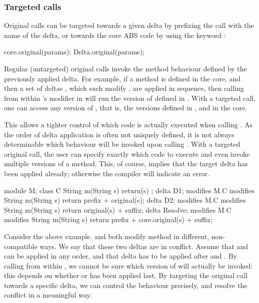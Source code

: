 \subsubsection{Targeted  calls}
Original calls can be targeted towards a given delta by prefixing the call with
the name of the delta, or towards the core ABS code by using the keyword
:
\begin{abscode}
core.original(params);
Delta.original(params);
\end{abscode}

Regular (untargeted) original calls invoke the method behaviour defined by the previously applied delta.
For example, if a method  is defined in the core, and then a set of deltas
, which each modify , are applied in sequence,
then calling  from within 's modifier in
 will run the version of  defined in .
With a targeted call, one can access any version of , that is, the
versions defined in ,  and in the core.

This allows a tighter control of which code is actually executed
when calling . As the order of delta application is often
not uniquely defined, it is not always determinable which behaviour will be invoked upon
calling . With a targeted original call, the user can
specify exactly which code to execute and even invoke multiple versions of a
method. This, of course, implies that the target delta has been applied already;
otherwise the compiler will indicate an error.

\begin{abscode}
module M;
class C {
    String m(String s) { return(s) };
}
delta D1;
modifies M.C {
    modifies String m(String s) { return prefix + original(s); }
}
delta D2;
modifies M.C {
    modifies String m(String s) { return original(s) + suffix; }
}
delta Resolve;
modifies M.C {
    modifies String m(String s) { return prefix + core.original(s) + suffix; }
}
\end{abscode}

Consider the above example.  and  both modify method  in
different, non-compatible ways. We say that these two deltas are in conflict.
Assume that  and  can be applied in any order, and that delta
 has to be applied after  and . By calling
 from within , we cannot be sure which version of
 will actually be invoked: this depends on whether  or 
has been applied last. By targeting the original call towards a specific delta,
we can control the behaviour precisely, and resolve the conflict in a meaningful
way.


